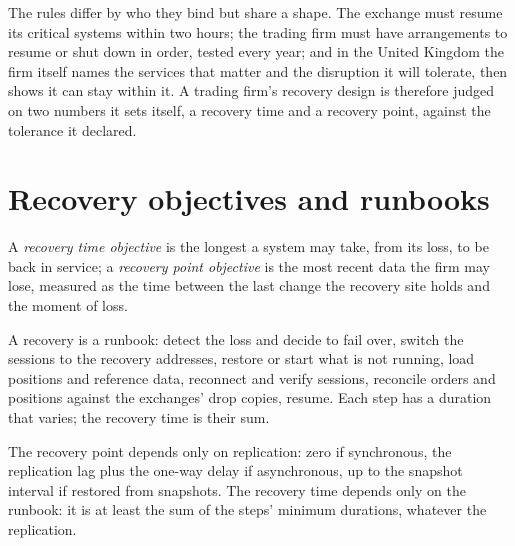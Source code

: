 The rules differ by who they bind but share a shape. The exchange must resume its critical systems within two hours; the trading firm
must have arrangements to resume or shut down in order, tested every year; and in the United Kingdom the firm itself names the
services that matter and the disruption it will tolerate, then shows it can stay within it. A trading firm's recovery design is
therefore judged on two numbers it sets itself, a recovery time and a recovery point, against the tolerance it declared.

\section{Recovery objectives and runbooks}

\begin{definition}\label{def:nw:disaster-recovery-and-regulatory-requirements:objectives}
A \emph{recovery time objective} is the longest a system may take, from its loss, to be back in
service; a \emph{recovery point objective} is the most recent data the firm may lose, measured as the
time between the last change the recovery site holds and the moment of loss.
\end{definition}

A recovery is a runbook: detect the loss and decide to fail over, switch the sessions to the recovery addresses, restore or start what
is not running, load positions and reference data, reconnect and verify sessions, reconcile orders and positions against the
exchanges' drop copies, resume. Each step has a duration that varies; the recovery time is their sum.

\label{lst:nw:disaster-recovery-and-regulatory-requirements:rto}

\begin{proposition}\label{prop:nw:disaster-recovery-and-regulatory-requirements:objectives}
The recovery point depends only on replication: zero if synchronous, the replication lag plus the one-way delay if asynchronous, up to
the snapshot interval if restored from snapshots. The recovery time depends only on the runbook: it is at least the sum of the steps'
minimum durations, whatever the replication.
\end{proposition}

